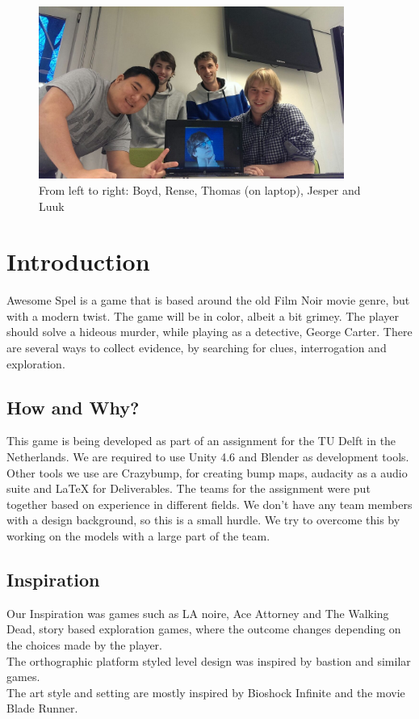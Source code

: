 \documentclass{article}
\begin{document}
	\begin{figure}[ht!]
		\centering
		\includegraphics[width=100mm]{images/Team.jpg}
		\caption{From left to right: Boyd, Rense, Thomas (on laptop), Jesper and Luuk}
		\end{figure}

	\newpage
		\tableofcontents
	\newpage

\section{Introduction}
	Awesome Spel is a game that is based around the old Film Noir movie genre, but with a modern twist. The game will be in color, albeit a bit grimey. The player should solve a hideous murder, while playing as a detective, George Carter. There are several ways to collect evidence, by searching for clues, interrogation and exploration.

	\subsection{How and Why?}
		This game is being developed as part of an assignment for the TU Delft in the Netherlands. We are required to use Unity 4.6 and Blender as development tools. Other tools we use are Crazybump, for creating bump maps, audacity as a audio suite and LaTeX for Deliverables. The teams for the assignment were put together based on experience in different fields. We don't have any team members with a design background, so this is a small hurdle. We try to overcome this by working on the models with a large part of the team.

	\subsection{Inspiration}
		Our Inspiration was games such as LA noire, Ace Attorney and The Walking Dead, story based exploration games, where the outcome changes depending on the choices made by the player.\\
		The orthographic platform styled level design was inspired by bastion and similar games.\\
		The art style and setting are mostly inspired by Bioshock Infinite and the movie Blade Runner.
\end{document}
